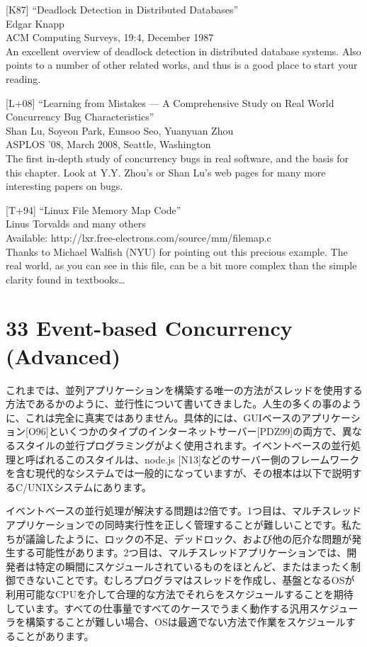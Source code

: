 {[}K87{]} ``Deadlock Detection in Distributed Databases''\\
Edgar Knapp\\
ACM Computing Surveys, 19:4, December 1987\\
An excellent overview of deadlock detection in distributed database
systems. Also points to a number of other related works, and thus is a
good place to start your reading.

{[}L+08{]} ``Learning from Mistakes --- A Comprehensive Study on Real
World Concurrency Bug Characteristics''\\
Shan Lu, Soyeon Park, Eunsoo Seo, Yuanyuan Zhou\\
ASPLOS '08, March 2008, Seattle, Washington\\
The first in-depth study of concurrency bugs in real software, and the
basis for this chapter. Look at Y.Y. Zhou's or Shan Lu's web pages for
many more interesting papers on bugs.

{[}T+94{]} ``Linux File Memory Map Code''\\
Linus Torvalds and many others\\
Available: http://lxr.free-electrons.com/source/mm/filemap.c\\
Thanks to Michael Walfish (NYU) for pointing out this precious example.
The real world, as you can see in this file, can be a bit more complex
than the simple clarity found in textbooks\ldots{}

\hypertarget{event-based-concurrency-advanced}{%
\section*{33 Event-based Concurrency
(Advanced)}\label{event-based-concurrency-advanced}}

これまでは、並列アプリケーションを構築する唯一の方法がスレッドを使用する方法であるかのように、並行性について書いてきました。人生の多くの事のように、これは完全に真実ではありません。具体的には、GUIベースのアプリケーション{[}O96{]}といくつかのタイプのインターネットサーバー{[}PDZ99{]}の両方で、異なるスタイルの並行プログラミングがよく使用されます。イベントベースの並行処理と呼ばれるこのスタイルは、node.js
{[}N13{]}などのサーバー側のフレームワークを含む現代的なシステムでは一般的になっていますが、その根本は以下で説明するC/UNIXシステムにあります。

イベントベースの並行処理が解決する問題は2倍です。1つ目は、マルチスレッドアプリケーションでの同時実行性を正しく管理することが難しいことです。私たちが議論したように、ロックの不足、デッドロック、および他の厄介な問題が発生する可能性があります。2つ目は、マルチスレッドアプリケーションでは、開発者は特定の瞬間にスケジュールされているものをほとんど、またはまったく制御できないことです。むしろプログラマはスレッドを作成し、基盤となるOSが利用可能なCPUを介して合理的な方法でそれらをスケジュールすることを期待しています。すべての仕事量ですべてのケースでうまく動作する汎用スケジューラを構築することが難しい場合、OSは最適でない方法で作業をスケジュールすることがあります。

